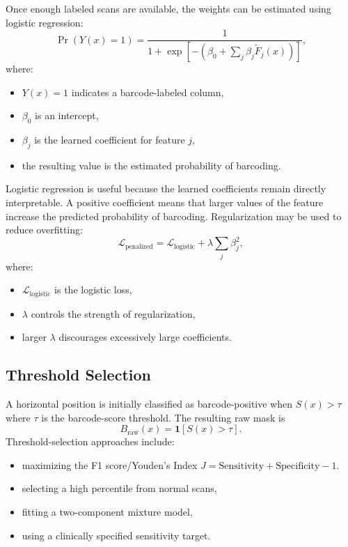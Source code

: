 \documentclass[11pt]{article}
\begin{document}
Once enough labeled scans are available, the weights can be estimated using
logistic regression:
\[
\Pr(Y(x)=1)
=
\frac{
1
}{
1+
\exp
\left[
-
\left(
\beta_0+
\sum_j\beta_j\widetilde{F}_j(x)
\right)
\right]
},
\]
where:
\begin{itemize}
    \item \(Y(x)=1\) indicates a barcode-labeled column,
    \item \(\beta_0\) is an intercept,
    \item \(\beta_j\) is the learned coefficient for feature \(j\),
    \item the resulting value is the estimated probability of barcoding.
\end{itemize}
Logistic regression is useful because the learned coefficients remain directly
interpretable. A positive coefficient means that larger values of the feature
increase the predicted probability of barcoding.
Regularization may be used to reduce overfitting:
\[
\mathcal{L}_{\mathrm{penalized}}
=
\mathcal{L}_{\mathrm{logistic}}
+
\lambda
\sum_j\beta_j^2,
\]
where:
\begin{itemize}
    \item \(\mathcal{L}_{\mathrm{logistic}}\) is the logistic loss,
    \item \(\lambda\) controls the strength of regularization,
    \item larger \(\lambda\) discourages excessively large coefficients.
\end{itemize}


\subsection{Threshold Selection}
A horizontal position is initially classified as barcode-positive when $S(x)>\tau$ where \(\tau\) is the barcode-score threshold.
The resulting raw mask is
\[
B_{\mathrm{raw}}(x)
=
\mathbf{1}
\left[
S(x)>\tau
\right].
\]
Threshold-selection approaches include:

\begin{itemize}
    \item maximizing the F1 score/Youden's Index $J=\text{Sensitivity}+\text{Specificity}-1.$
    \item selecting a high percentile from normal scans,
    \item fitting a two-component mixture model,
    \item using a clinically specified sensitivity target.
\end{itemize}
\end{document}
